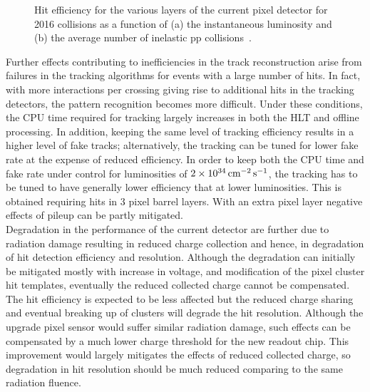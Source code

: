 \begin{figure}[!htb]
 \begin{center}
 \end{center}
 \caption{Hit efficiency for the various layers of the current pixel detector for 2016 collisions as a function of (a) the instantaneous luminosity and (b) the average number of inelastic pp collisions~\cite{PixelOffline}.}
 \label{fig:PixEff}
\end{figure}

Further effects contributing to inefficiencies in the track reconstruction arise from failures in the tracking algorithms for events with a large number of hits. In fact, with more interactions per crossing giving rise to additional hits in the tracking detectors, the pattern recognition becomes more difficult. Under these conditions, the CPU time required for tracking largely increases in both the HLT and offline processing. In addition, keeping the same level of tracking efficiency results in a higher level of fake tracks; alternatively, the tracking can be tuned for lower fake rate at the expense of reduced efficiency.
In order to keep both the CPU time and fake rate under control for luminosities of $2\times10^{34}\,\text{cm}^\text{$-$2}\,\text{s}^\text{$-$1}$, the tracking has to be tuned to have generally lower efficiency that at lower luminosities. This is obtained requiring hits in 3 pixel barrel layers. With an extra pixel layer negative effects of pileup can be partly mitigated.\\

Degradation in the performance of the current detector are further due to radiation damage resulting in reduced charge collection and hence, in degradation of hit detection efficiency and resolution.
Although the degradation can initially be mitigated mostly with increase in voltage, and modification of the pixel cluster hit templates, eventually the reduced collected charge cannot be compensated. The hit efficiency is expected to be less affected but the reduced charge sharing and eventual breaking up of clusters will degrade the hit resolution. Although the upgrade pixel sensor would suffer similar radiation damage, such effects can be compensated by a much lower charge threshold for the new readout chip. This improvement would largely mitigates the effects of reduced collected charge, so degradation in hit resolution should be much reduced comparing to the same radiation fluence.\\

